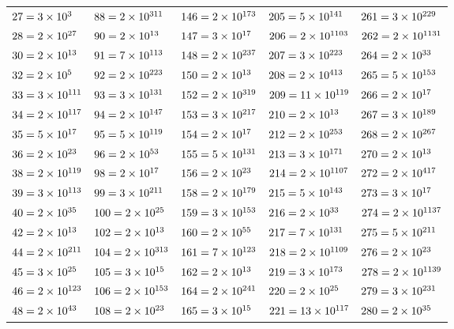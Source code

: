 \documentclass[10pt,a4paper]{book}
\begin{document}
\begin{tabular}{lllll}
	$27=\num{3e{3}}$&$88=\num{2e{3}11e{1}}$&$146=\num{2e{1}73e{1}}$&$205=\num{5e{1}41e{1}}$&$261=\num{3e{2}29e{1}}$\\
	$28=\num{2e{2}7e{1}}$&$90=\num{2e{1}3e{2}5e{1}}$&$147=\num{3e{1}7e{2}}$&$206=\num{2e{1}103e{1}}$&$262=\num{2e{1}131e{1}}$\\
	$30=\num{2e{1}3e{1}5e{1}}$&$91=\num{7e{1}13e{1}}$&$148=\num{2e{2}37e{1}}$&$207=\num{3e{2}23e{1}}$&$264=\num{2e{3}3e{1}11e{1}}$\\
	$32=\num{2e{5}}$&$92=\num{2e{2}23e{1}}$&$150=\num{2e{1}3e{1}5e{2}}$&$208=\num{2e{4}13e{1}}$&$265=\num{5e{1}53e{1}}$\\
	$33=\num{3e{1}11e{1}}$&$93=\num{3e{1}31e{1}}$&$152=\num{2e{3}19e{1}}$&$209=\num{11e{1}19e{1}}$&$266=\num{2e{1}7e{1}19e{1}}$\\
	$34=\num{2e{1}17e{1}}$&$94=\num{2e{1}47e{1}}$&$153=\num{3e{2}17e{1}}$&$210=\num{2e{1}3e{1}5e{1}7e{1}}$&$267=\num{3e{1}89e{1}}$\\
	$35=\num{5e{1}7e{1}}$&$95=\num{5e{1}19e{1}}$&$154=\num{2e{1}7e{1}11e{1}}$&$212=\num{2e{2}53e{1}}$&$268=\num{2e{2}67e{1}}$\\
	$36=\num{2e{2}3e{2}}$&$96=\num{2e{5}3e{1}}$&$155=\num{5e{1}31e{1}}$&$213=\num{3e{1}71e{1}}$&$270=\num{2e{1}3e{3}5e{1}}$\\
	$38=\num{2e{1}19e{1}}$&$98=\num{2e{1}7e{2}}$&$156=\num{2e{2}3e{1}13e{1}}$&$214=\num{2e{1}107e{1}}$&$272=\num{2e{4}17e{1}}$\\
	$39=\num{3e{1}13e{1}}$&$99=\num{3e{2}11e{1}}$&$158=\num{2e{1}79e{1}}$&$215=\num{5e{1}43e{1}}$&$273=\num{3e{1}7e{1}13e{1}}$\\
	$40=\num{2e{3}5e{1}}$&$100=\num{2e{2}5e{2}}$&$159=\num{3e{1}53e{1}}$&$216=\num{2e{3}3e{3}}$&$274=\num{2e{1}137e{1}}$\\
	$42=\num{2e{1}3e{1}7e{1}}$&$102=\num{2e{1}3e{1}17e{1}}$&$160=\num{2e{5}5e{1}}$&$217=\num{7e{1}31e{1}}$&$275=\num{5e{2}11e{1}}$\\
	$44=\num{2e{2}11e{1}}$&$104=\num{2e{3}13e{1}}$&$161=\num{7e{1}23e{1}}$&$218=\num{2e{1}109e{1}}$&$276=\num{2e{2}3e{1}23e{1}}$\\
	$45=\num{3e{2}5e{1}}$&$105=\num{3e{1}5e{1}7e{1}}$&$162=\num{2e{1}3e{4}}$&$219=\num{3e{1}73e{1}}$&$278=\num{2e{1}139e{1}}$\\
	$46=\num{2e{1}23e{1}}$&$106=\num{2e{1}53e{1}}$&$164=\num{2e{2}41e{1}}$&$220=\num{2e{2}5e{1}11e{1}}$&$279=\num{3e{2}31e{1}}$\\
	$48=\num{2e{4}3e{1}}$&$108=\num{2e{2}3e{3}}$&$165=\num{3e{1}5e{1}11e{1}}$&$221=\num{13e{1}17e{1}}$&$280=\num{2e{3}5e{1}7e{1}}$\\

\end{tabular}
\end{document}
